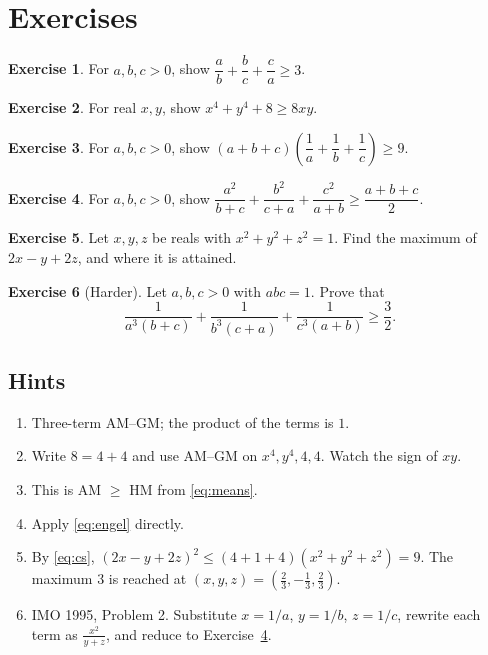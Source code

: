 \documentclass[11pt,a4paper]{article}
\theoremstyle{definition}
\newtheorem{exercise}{Exercise}
\theoremstyle{remark}
\begin{document}
\section*{Exercises}

\begin{exercise}\label{exr:cyclic}
For $a, b, c > 0$, show $\dfrac{a}{b} + \dfrac{b}{c} + \dfrac{c}{a} \geq 3$.
\end{exercise}

\begin{exercise}\label{exr:quartic}
For real $x, y$, show $x^4 + y^4 + 8 \geq 8xy$.
\end{exercise}

\begin{exercise}\label{exr:harmonic}
For $a, b, c > 0$, show $(a + b + c)\left(\dfrac1a + \dfrac1b + \dfrac1c\right) \geq 9$.
\end{exercise}

\begin{exercise}\label{exr:engel2}
For $a, b, c > 0$, show $\dfrac{a^2}{b + c} + \dfrac{b^2}{c + a} + \dfrac{c^2}{a + b} \geq \dfrac{a + b + c}{2}$.
\end{exercise}

\begin{exercise}\label{exr:vector}
Let $x, y, z$ be reals with $x^2 + y^2 + z^2 = 1$. Find the maximum of $2x - y + 2z$, and where it is attained.
\end{exercise}

\begin{exercise}[Harder]\label{exr:imo}
Let $a, b, c > 0$ with $abc = 1$. Prove that
\[
  \frac{1}{a^3(b + c)} + \frac{1}{b^3(c + a)} + \frac{1}{c^3(a + b)} \geq \frac{3}{2}.
\]
\end{exercise}

\subsection*{Hints}

\begin{enumerate}[label=\textbf{\arabic*.}, leftmargin=*]
  \item Three-term AM--GM; the product of the terms is $1$.
  \item Write $8 = 4 + 4$ and use AM--GM on $x^4, y^4, 4, 4$. Watch the sign of $xy$.
  \item This is AM $\geq$ HM from \eqref{eq:means}.
  \item Apply \eqref{eq:engel} directly.
  \item By \eqref{eq:cs}, $(2x - y + 2z)^2 \leq (4 + 1 + 4)(x^2 + y^2 + z^2) = 9$. The maximum $3$ is reached at $(x, y, z) = (\tfrac23, -\tfrac13, \tfrac23)$.
  \item IMO 1995, Problem 2. Substitute $x = 1/a$, $y = 1/b$, $z = 1/c$, rewrite each term as $\frac{x^2}{y + z}$, and reduce to Exercise~\ref{exr:engel2}.
\end{enumerate}



\end{document}
